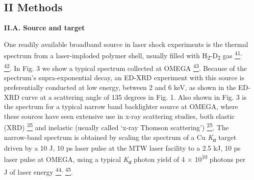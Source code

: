 \subsection{II Methods}\label{ii-methods}

\textbf{II.A. Source and target}

One readily available broadband source in laser shock experiments is the
thermal spectrum from a laser-imploded polymer shell, usually filled
with H\textsubscript{2}-D\textsubscript{2} gas
\hyperref[b.-r.-maddox-et-al.-physics-of-plasmas-18-056709-2011.]{\textsuperscript{41}}\textsuperscript{,}
\hyperref[b.-yaakobi-f.-j.-marshall-t.-r.-boehly-r.-p.-j.-town-and-d.-d.-meyerhofer-journal-of-the-optical-society-of-america-b-optical-physics-20-238-2003.]{\textsuperscript{42}}.
In Fig. 3 we show a typical spectrum collected at OMEGA
\hyperref[b.-yaakobi-2012-private-communication.]{\textsuperscript{43}}.
Because of the spectrum's supra-exponential decay, an ED-XRD experiment
with this source is preferentially conducted at low energy, between 2
and 6 keV, as shown in the ED-XRD curve at a scattering angle of 135
degrees in Fig. 1. Also shown in Fig. 3 is the spectrum for a typical
narrow band backlighter source at OMEGA, where these sources have seen
extensive use in x-ray scattering studies, both elastic (XRD)
\hyperref[t.-ma-et-al.-physical-review-letters-110-065001-2013.]{\textsuperscript{35}}
and inelastic (usually called `x-ray Thomson scattering')
\hyperref[s.-h.-glenzer-and-r.-redmer-reviews-of-modern-physics-81-1625-2009.]{\textsuperscript{25}}.
The narrow-band spectrum is obtained by scaling the spectrum of a Cu
\emph{K\textsubscript{α}} target driven by a 10 J, 10 ps laser pulse at
the MTW laser facility to a 2.5 kJ, 10 ps laser pulse at OMEGA, using a
typical \emph{K\textsubscript{α}} photon yield of 4 ×
10\textsuperscript{10} photons per J of laser energy
\hyperref[p.-m.-nilson-2012-private-communication.]{\textsuperscript{44}}\textsuperscript{,}
\hyperref[k.-u.-akli-et-al.-physics-of-plasmas-14-023102-2007.]{\textsuperscript{45}}.

